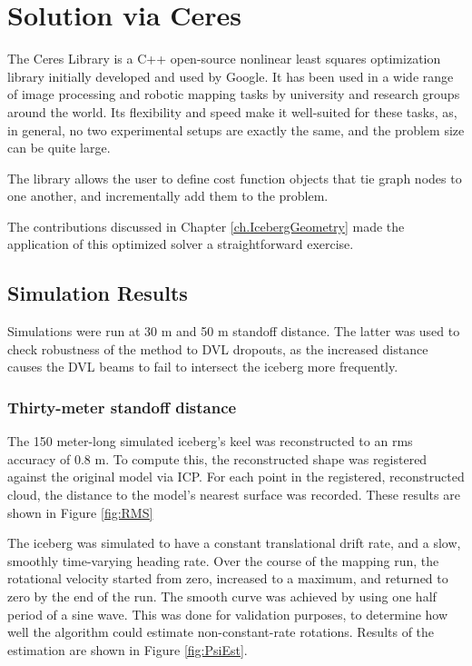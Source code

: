 \section{Solution via Ceres}

The Ceres Library is a C++ open-source nonlinear least squares optimization library initially developed and used by Google. It has been used in a wide range of image processing and robotic mapping tasks by university and research groups around the world. Its flexibility and speed make it well-suited for these tasks, as, in general, no two experimental setups are exactly the same, and the problem size can be quite large.  

The library allows the user to define cost function objects that tie graph nodes to one another, and incrementally add them to the problem. 

The contributions discussed in Chapter \ref{ch.IcebergGeometry} made the application of this optimized solver a straightforward exercise. 

\subsection{Simulation Results}

Simulations were run at 30 m and 50 m standoff distance. The latter was used to check robustness of the method to DVL dropouts, as the increased distance causes the DVL beams to fail to intersect the iceberg more frequently.

\subsubsection{Thirty-meter standoff distance}

The 150 meter-long simulated iceberg's keel was reconstructed to an rms accuracy of 0.8 m. To compute this, the reconstructed shape was registered against the original model via ICP. For each point in the registered, reconstructed cloud, the distance to the model's nearest surface was recorded. These results are shown in Figure \ref{fig:RMS}

The iceberg was simulated to have a constant translational drift rate, and a slow, smoothly time-varying heading rate. Over the course of the mapping run, the rotational velocity started from zero, increased to a maximum, and returned to zero by the end of the run. The smooth curve was achieved by using one half period of a sine wave. This was done for validation purposes, to determine how well the algorithm could estimate non-constant-rate rotations. Results of the estimation are shown in Figure \ref{fig:PsiEst}.

